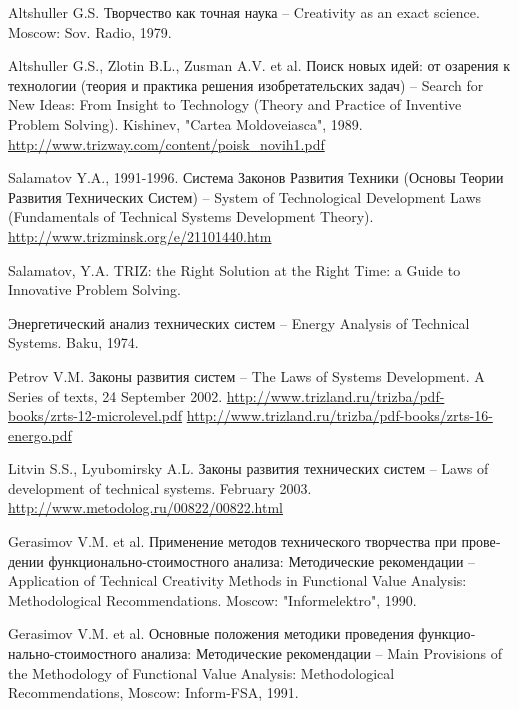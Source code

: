 \documentclass[a4paper,11pt]{article}
\begin{document}
\begin{thebibliography}{xxx}
 Altshuller G.S. \foreignlanguage{russian}{Творчество как точная
  наука} -- Creativity as an exact science. Moscow: Sov. Radio, 1979.

 Altshuller G.S., Zlotin B.L., Zusman A.V. et al.
  \foreignlanguage{russian}{Поиск новых идей: от озарения к технологии (теория
    и практика решения изобретательских задач)} -- Search for New Ideas: From
  Insight to Technology (Theory and Practice of Inventive Problem Solving).
  Kishinev, "Cartea Moldoveiasca", 1989.
  \url{http://www.trizway.com/content/poisk_novih1.pdf}

 Salamatov Y.A., 1991-1996. \foreignlanguage{russian}{Система
  Законов Развития Техники (Основы Теории Развития Технических Систем)} --
  System of Technological Development Laws (Fundamentals of Technical Systems
  Development Theory).  \url{http://www.trizminsk.org/e/21101440.htm}

  Salamatov, Y.A. TRIZ: the Right Solution at the Right Time: a Guide to
  Innovative Problem Solving.

 \foreignlanguage{russian}{Энергетический анализ технических
  систем} -- Energy Analysis of Technical Systems. Baku, 1974.

 Petrov V.M. \foreignlanguage{russian}{Законы развития систем} --
  The Laws of Systems Development. A Series of texts, 24 September 2002.
  \url{http://www.trizland.ru/trizba/pdf-books/zrts-12-microlevel.pdf}
  \url{http://www.trizland.ru/trizba/pdf-books/zrts-16-energo.pdf}

 Litvin S.S., Lyubomirsky A.L. \foreignlanguage{russian}{Законы
  развития технических систем} -- Laws of development of technical systems.
  February 2003. \url{http://www.metodolog.ru/00822/00822.html}

 Gerasimov V.M. et al. \foreignlanguage{russian}{Применение
  методов технического творчества при проведении функционально-стоимостного
  анализа: Методические рекомендации} -- Application of Technical Creativity
  Methods in Functional Value Analysis: Methodological Recommendations. Moscow:
  "Informelektro", 1990.

 Gerasimov V.M. et al. \foreignlanguage{russian}{Основные
  положения методики проведения функционально-стоимостного анализа:
  Методические рекомендации} -- Main Provisions of the Methodology of
  Functional Value Analysis: Methodological Recommendations, Moscow:
  Inform-FSA, 1991.


\end{thebibliography}
\end{document}
